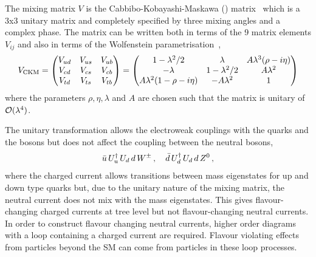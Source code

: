 The mixing matrix $V$ is the Cabbibo-Kobayashi-Maskawa (\ckm) matrix~\cite{Cabibbo:1963yz,Kobayashi:1973fv} which is a 3x3 
unitary matrix and completely specified by three mixing angles and a complex phase.
The \ckm matrix can be written both in terms of the 9 matrix elements $V_{ij}$ and also 
in terms of the Wolfenstein parametrisation~\cite{PDG2012},
\begin{align}
V_{\mathrm{CKM}} = 
\begin{pmatrix}
V_{ud} & V_{us} & V_{ub} \\
V_{cd} & V_{cs} & V_{cb} \\
V_{td} & V_{ts} & V_{tb} 
\end{pmatrix}
=
\begin{pmatrix}
1 - \lambda^2 / 2 & \lambda & A \lambda^3(\rho-i\eta) \\
 - \lambda &  1 - \lambda^2 / 2 & A\lambda^2 \\
A \lambda^2(1-\rho-i\eta)  & -A\lambda^2 & 1 
\end{pmatrix}
\end{align}
where the parameters $\rho, \eta, \lambda$ and $A$ are chosen such that the matrix is unitary of ${\cal O}(\lambda^4)$.

The unitary transformation allows the electroweak couplings with the quarks and the \Wpm bosons
but does not affect the coupling between the neutral bosons,
\begin{align}
\bar{u}\, U_u^{\dagger}\, U_d\, d\, W^\pm \, , \quad \bar{d}\, U_d^{\dagger}\, U_d\, d\, Z^0 \, ,
\end{align} 
where the charged current allows transitions between mass eigenstates for up and down type quarks 
but, due to the unitary nature of the mixing matrix, the neutral current does not mix with the mass eigenstates.
This gives flavour-changing charged currents at tree level but not flavour-changing neutral currents.
In order to construct flavour changing neutral currents, higher order diagrams with a loop containing a charged current
are required.
Flavour violating effects from particles beyond the SM can come from particles in these loop processes.

%

